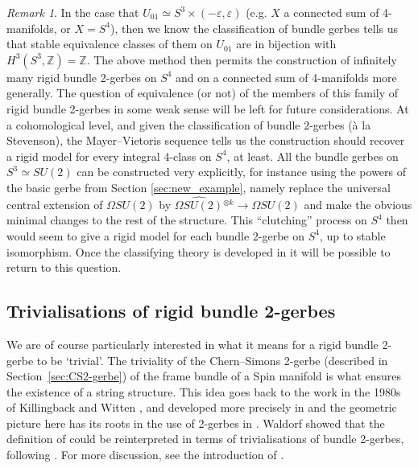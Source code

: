 \documentclass[12pt]{amsart}
\theoremstyle{plain}
\theoremstyle{definition}
\theoremstyle{remark}
\newtheorem{remark}[theorem]{Remark}
\numberwithin{equation}{section}
\newcommand{\ZZ}{{\mathbb Z}}
\newcommand{\<}{\langle}
\renewcommand{\>}{\rangle}
\begin{document}
\begin{remark}
In the case that $U_{01}\simeq S^3\times  (-\varepsilon,\varepsilon)$ (e.g. $X$ a connected sum of 4-manifolds, or $X=S^4$), then we know the classification of bundle gerbes tells us that stable equivalence classes of them on $U_{01}$ are in bijection with $H^3(S^3,\ZZ) = \ZZ$.
The above method then permits the construction of infinitely many rigid bundle 2-gerbes on $S^4$ and on a connected sum of 4-manifolds more generally. 
The question of equivalence (or not) of the members of this family of rigid bundle 2-gerbes in some weak sense will be left for future considerations. 
At a cohomological level, and given the classification of bundle 2-gerbes (\`a la Stevenson), the Mayer--Vietoris sequence tells us the construction should recover a rigid model for every integral 4-class on $S^4$, at least.
All the bundle gerbes on $S^3\simeq SU(2)$ can be constructed very explicitly, for instance using the powers of the basic gerbe from Section \ref{sec:new_example}, namely replace the universal central extension of $\Omega SU(2)$ by ${\widehat{\Omega SU(2)}{}^{\otimes k}} \to \Omega SU(2)$ and make the obvious minimal changes to the rest of the structure.
This ``clutching'' process on $S^4$ then would seem to give a rigid model for each bundle 2-gerbe on $S^4$, up to stable isomorphism.
Once the classifying theory is developed in \cite{rb2g_II} it will be possible to return to this question.
\end{remark}



\subsection{Trivialisations of rigid bundle 2-gerbes}


We are of course particularly interested in what it means for a rigid bundle 2-gerbe to be `trivial'. 
The triviality of the Chern--Simons 2-gerbe (described in Section~\ref{sec:CS2-gerbe}) of the frame bundle of a Spin manifold is what ensures the existence of a string structure. 
This idea goes back to the work in the 1980s of Killingback \cite{Killingback_87} and Witten \cite{Witten_85}, and developed more precisely in \cite{McL_92} and the geometric picture here has its roots in the use of 2-gerbes in \cite{BM}. Waldorf \cite{Wal} showed that the definition of \cite{Stolz-Teichner} could be reinterpreted in terms of trivialisations of bundle 2-gerbes, following \cite{CJMSW}. For more discussion, see the introduction of \cite{Wal}.
\end{document}
